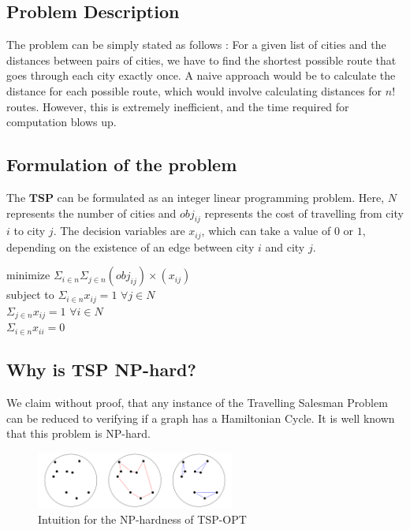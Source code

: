 \documentclass[conference]{IEEEtran}
\begin{document}
\subsection{Problem Description}
The problem can be simply stated as follows :  
For a given list of cities and the distances between pairs of cities, we have to find the shortest possible route that goes through each city exactly once. 
A naive approach would be to calculate the distance for each possible route, which would involve calculating distances for $n!$ routes. However, this is extremely inefficient, and the time required for computation blows up. 

\subsection{Formulation of the problem}

The $\textbf{TSP}$ can be formulated as an integer linear programming problem. Here, $N$ represents the number of cities and $obj_{ij}$ represents the cost of travelling from city $i$ to city $j$. 
The decision variables are $x_{ij}$, which can take a value of $0$ or $1$, depending on the existence of an edge between city $i$ and city $j$. 

minimize \hspace*{10mm}$\Sigma_{i \in n} \Sigma_{j \in n} (obj_{ij}) \times (x_{ij})$ \\
\hspace*{2.5mm} subject to \hspace*{8mm} $\Sigma_{i \in n} x_{ij} = 1$ $\forall j \in N$\\
\hspace*{27 mm} $\Sigma_{j \in n} x_{ij} = 1$ $\forall i \in N$\\
\hspace*{27 mm} $\Sigma_{i \in n} x_{ii} = 0$

\subsection{Why is TSP NP-hard?}
We claim without proof, that any instance of the Travelling Salesman Problem can be reduced to verifying if a graph has a Hamiltonian Cycle. It is well known that this problem is NP-hard. 

\begin{figure}[htp]
\centering
    \includegraphics[width=6.5cm]{NPHard.png}
    \caption{Intuition for the NP-hardness of TSP-OPT}
    \label{fig : Intuition for the NP-hardness of TSP-OPT}
\end{figure}
\end{document}
